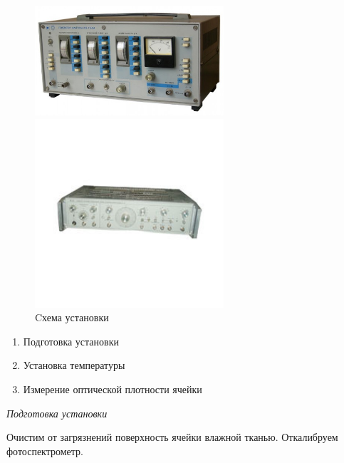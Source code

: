 \documentclass[a4paper,12pt]{article} %
\begin{document}
\begin{figure}[h]
	\begin{center}
		\begin{minipage}{0.45 \linewidth}
			\includegraphics[width = 7cm]{Images/Producer G5-54.jpg}
		\end{minipage}
		\qquad
		\begin{minipage}{0.45 \linewidth}
			\includegraphics[width = 7cm]{Images/Producer G6-34.jpg}
		\end{minipage}
	\end{center}
	\caption{Cхема установки}
\end{figure}


\begin{enumerate}
	\item Подготовка установки
	\item Установка температуры
	\item Измерение оптической плотности ячейки
\end{enumerate}


\emph{Подготовка установки}

Очистим от загрязнений поверхность ячейки влажной тканью. Откалибруем фотоспектрометр.
\end{document}
